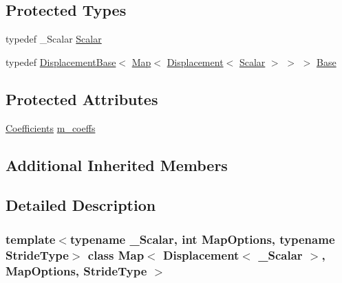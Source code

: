 \subsection*{Protected Types}
\begin{DoxyCompactItemize}
\item 
typedef \+\_\+\+Scalar \hyperlink{class_map_3_01_displacement_3_01___scalar_01_4_00_01_map_options_00_01_stride_type_01_4_a1558058db0e90cb7253d6b2dbf414099}{Scalar}
\item 
typedef \hyperlink{class_displacement_base}{Displacement\+Base}$<$ \hyperlink{class_map_3_01_displacement_3_01___scalar_01_4_00_01_map_options_00_01_stride_type_01_4_a7355e77dc9b91bd8cb68f20847318f0f}{Map}$<$ \hyperlink{class_displacement}{Displacement}$<$ \hyperlink{class_map_3_01_displacement_3_01___scalar_01_4_00_01_map_options_00_01_stride_type_01_4_a1558058db0e90cb7253d6b2dbf414099}{Scalar} $>$ $>$ $>$ \hyperlink{class_map_3_01_displacement_3_01___scalar_01_4_00_01_map_options_00_01_stride_type_01_4_a1df1fc84e68f902341a4d48037cf82dd}{Base}
\end{DoxyCompactItemize}
\subsection*{Protected Attributes}
\begin{DoxyCompactItemize}
\item 
\hyperlink{class_map_3_01_displacement_3_01___scalar_01_4_00_01_map_options_00_01_stride_type_01_4_a3213feadb99e77889a832a1ef1e80b4b}{Coefficients} \hyperlink{class_map_3_01_displacement_3_01___scalar_01_4_00_01_map_options_00_01_stride_type_01_4_a07b764e529a32d3b74ffc19d4a0949ab}{m\+\_\+coeffs}
\end{DoxyCompactItemize}
\subsection*{Additional Inherited Members}


\subsection{Detailed Description}
\subsubsection*{template$<$typename \+\_\+\+Scalar, int Map\+Options, typename Stride\+Type$>$\newline
class Map$<$ Displacement$<$ \+\_\+\+Scalar $>$, Map\+Options, Stride\+Type $>$}

